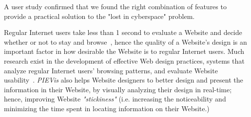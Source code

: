 \documentclass[]{article}
\begin{document}
A user study confirmed that we found the right combination of features to provide a practical solution to the "lost in cyberspace" problem.

Regular Internet users take less than 1 second to evaluate a Website and decide whether or not to stay and browse~\cite{mw-04}, hence the quality of a Website's design is an important factor in how desirable the Website is to regular Internet users.
Much research exist in the development of effective Web design practices, systems that analyze regular Internet users' browsing patterns, and evaluate Website usability~\cite{w-02, ih-02}.
{\em PIEVis} also helps Website designers to better design and present the information in their Website, by visually analyzing their design in real-time; hence, improving Website {\em "stickiness"} (i.e. increasing the noticeability and minimizing the time spent in locating information on their Website.)
\end{document}
